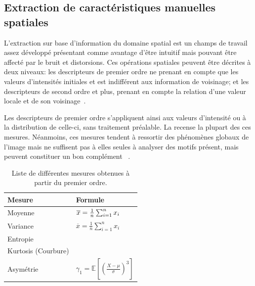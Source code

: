 \subsection{Extraction de caractéristiques manuelles spatiales}
L'extraction sur base d'information du domaine spatial est un champs de travail assez développé présentant comme avantage d'être intuitif mais pouvant être affecté par le bruit et distorsions. Ces opérations spatiales peuvent être décrites à deux niveaux: les descripteurs de premier ordre ne prenant en compte que les valeurs d'intensités initiales et est indifférent aux information de voisinage; et les descripteurs de second ordre et plus, prenant en compte la relation d'une valeur locale et de son voisinage~\cite{Kamila2015}.\par

Les descripteurs de premier ordre s'appliquent ainsi aux valeurs d'intensité ou à la distribution de celle-ci, sans traitement préalable. La  recense la plupart des ces mesures. Néanmoins, ces mesures tendent à ressortir des phénomènes globaux de l'image mais ne suffisent pas à elles seules à analyser  des motifs présent, mais peuvent constituer un bon complément ~\cite{Tomita1990, Srinivasan2008, Uyun2013, NyeinNyeinHlaing2015}.\par

\begin{table}[H]
    \centering
    \begin{tabular}{ll}
        \toprule
        \textbf{Mesure}             & \textbf{Formule}                                                              \\ \hline
        Moyenne                     & $\overline{x} = {1 \over n} \sum_{i=1}^n{x_i}$                                \\   
        Variance                    & $\overline{x} = \frac{1}{n}\sum_{i=1}^n x_i$                                  \\ 
        Entropie                    & \\
        Kurtosis (Courbure)         & \\
        Asymétrie                   & $\gamma_1 = \mathbb{E} \left[ \left( \frac{X - \mu}{\sigma} \right)^3 \right]$\\  
        \bottomrule
    \end{tabular}
    \caption{Liste de différentes mesures obtenues à partir du premier ordre.}
    \label{tab:first_order_descriptors}
\end{table}\par

